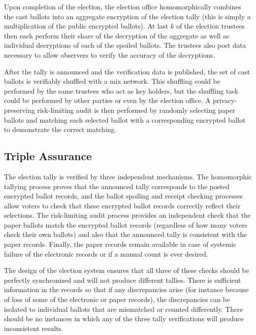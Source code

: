 Upon completion of the election, the election office homomorphically combines the cast ballots into an aggregate encryption of the election tally (this is simply a multiplication of the public encrypted ballots).  At last $k$ of the election trustees then each perform their share of the decryption of the aggregate as well as individual decryptions of each of the spoiled ballots.  The trustees also post data necessary to allow observers to verify the accuracy of the decryptions.

After the tally is announced and the verification data is published, the set of cast ballots is verifiably shuffled with a mix network.  This shuffling could be performed by the same trustees who act as key holders, but the shuffling task could be performed by other parties or even by the election office.  A privacy-preserving risk-limiting audit is then performed by randomly selecting paper ballots and matching each selected ballot with a corresponding encrypted ballot to demonstrate the correct matching.

\subsection{Triple Assurance}

The election tally is verified by three independent mechanisms.  The homomorphic tallying process proves that the announced tally corresponds to the posted encrypted ballot records, and the ballot spoiling and receipt checking processes allow voters to check that these encrypted ballot records correctly reflect their selections.  The risk-limiting audit process provides an independent check that the paper ballots match the encrypted ballot records (regardless of how many voters check their own ballots) and also that the announced tally is consistent with the paper records.  Finally, the paper records remain available in case of systemic failure of the electronic records or if a manual count is ever desired.

The design of the election system ensures that all three of these checks should be perfectly synchronized and will not produce different tallies.  There is sufficient information in the records so that if any discrepancies arise (for instance because of loss of some of the electronic or paper records), the discrepancies can be isolated to individual ballots that are mismatched or counted differently.  There should be no instances in which any of the three tally verifications will produce inconsistent results.

